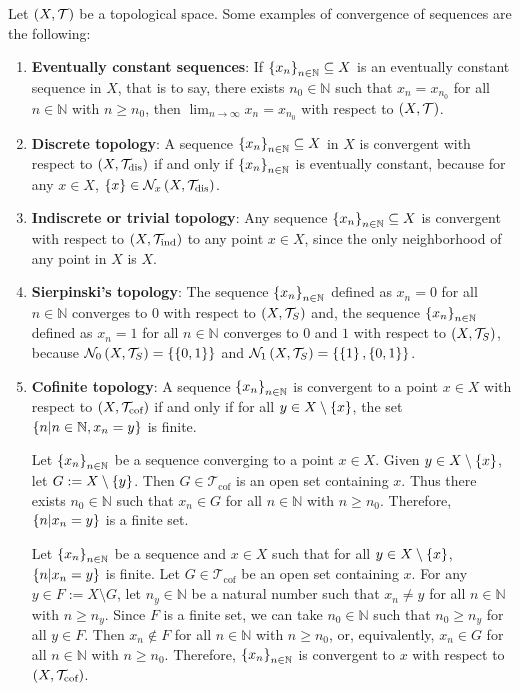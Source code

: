\begin{example}
  Let $\left(X,\mathcal{T}\right)$ be a topological space. Some examples of convergence of sequences are the following:
  \begin{enumerate}
    \item \textbf{Eventually constant sequences}: If $\left\{x_n\right\}_{n\in\mathbb{N}}\subseteq X$ is an eventually constant sequence in $X$, that is to say, there exists $n_0\in\mathbb{N}$ such that $x_n=x_{n_0}$ for all $n\in\mathbb{N}$ with $n\geq n_0$, then $\lim_{n\to\infty}{x_n}=x_{n_0}$ with respect to $\left(X,\mathcal{T}\right)$.
    \item \textbf{Discrete topology}: A sequence $\left\{x_n\right\}_{n\in\mathbb{N}}\subseteq X$ in $X$ is convergent with respect to $\left(X,\mathcal{T}_{\text{dis}}\right)$ if and only if $\left\{x_n\right\}_{n\in\mathbb{N}}$ is eventually constant, because for any $x\in X$, $\left\{x\right\}\in\mathcal{N}_x\left(X,\mathcal{T}_{\text{dis}}\right)$. 
    \item \textbf{Indiscrete or trivial topology}: Any sequence $\left\{x_n\right\}_{n\in\mathbb{N}}\subseteq X$ is convergent with respect to $\left(X,\mathcal{T}_{\text{ind}}\right)$ to any point $x\in X$, since the only neighborhood of any point in $X$ is $X$.
    \item \textbf{Sierpinski's topology}: The sequence $\left\{x_n\right\}_{n\in\mathbb{N}}$ defined as $x_n=0$ for all $n\in\mathbb{N}$ converges to $0$ with respect to $\left(X,\mathcal{T}_S\right)$ and, the sequence $\left\{x_n\right\}_{n\in\mathbb{N}}$ defined as $x_n=1$ for all $n\in\mathbb{N}$ converges to $0$ and $1$ with respect to $\left(X,\mathcal{T}_S\right)$, because $\mathcal{N}_0\left(X,\mathcal{T}_S\right)=\left\{\left\{0,1\right\}\right\}$ and $\mathcal{N}_1\left(X,\mathcal{T}_S\right)=\left\{\left\{1\right\},\left\{0,1\right\}\right\}$.
    \item \textbf{Cofinite topology}: A sequence $\left\{x_n\right\}_{n\in\mathbb{N}}$ is convergent to a point $x\in X$ with respect to $\left(X,\mathcal{T}_{\text{cof}}\right)$ if and only if for all $y\in X\setminus\left\{x\right\}$, the set $\left\{n\middle|n\in\mathbb{N},x_n=y\right\}$ is finite. 
    
    Let $\left\{x_n\right\}_{n\in\mathbb{N}}$ be a sequence converging to a point $x\in X$. Given $y\in X\setminus\left\{x\right\}$, let $G:=X\setminus\left\{y\right\}$. Then $G\in\mathcal{T}_{\text{cof}}$ is an open set containing $x$. Thus there exists $n_0\in\mathbb{N}$ such that $x_n\in G$ for all $n\in\mathbb{N}$ with $n\geq n_0$. Therefore, $\left\{n\middle|x_n=y\right\}$ is a finite set.

    Let $\left\{x_n\right\}_{n\in\mathbb{N}}$ be a sequence and $x\in X$ such that for all $y\in X\setminus\left\{x\right\}$, $\left\{n\middle|x_n=y\right\}$ is finite. Let $G\in\mathcal{T}_{\text{cof}}$ be an open set containing $x$. For any $y\in F:=X\setminus G$, let $n_y\in\mathbb{N}$ be a natural number such that $x_n\neq y$ for all $n\in\mathbb{N}$ with $n\geq n_y$. Since $F$ is a finite set, we can take $n_0\in\mathbb{N}$ such that $n_0\geq n_y$ for all $y\in F$. Then $x_n\notin F$ for all $n\in\mathbb{N}$ with $n\geq n_0$, or, equivalently, $x_n\in G$ for all $n\in\mathbb{N}$ with $n\geq n_0$. Therefore, $\left\{x_n\right\}_{n\in\mathbb{N}}$ is convergent to $x$ with respect to $\left(X,\mathcal{T}_{\text{cof}}\right)$.
    

\end{enumerate}
\end{example}
